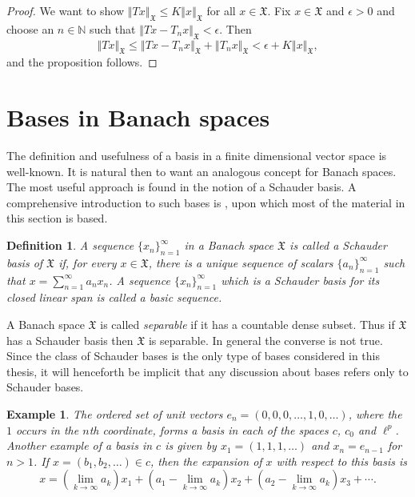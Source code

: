 \documentclass[mstat,12pt]{unswthesis}  %
\newcommand{\N}{\mathbb{N}}
\newcommand{\X}{\mathfrak{X}}
\def\lp{\ell^p}
\def\norm#1{\left \Vert #1 \right \Vert}
\newtheorem{definition}[theorem]{Definition}
\newtheorem{example}[theorem]{Example}
\numberwithin{equation}{section}
\begin{document}
\begin{proof}
We want to show $\norm{Tx}_{\X}\leq K\norm{x}_{\X}$ for all $x\in\X$. Fix
$x\in\X$ and $\epsilon>0$ and choose an $n\in\N$ such that
$\norm{Tx-T_nx}_{\X}<\epsilon$. Then 
\[\norm{Tx}_{\X}\leq\norm{Tx-T_nx}_{\X}+\norm{T_nx}_{\X}
<\epsilon+K\norm{x}_{\X},\]
and the proposition follows.
\end{proof}



\section{Bases in Banach spaces}\label{bases}


The definition and usefulness of a basis in a finite dimensional vector space is
well-known. It is natural then to want an analogous concept for
Banach spaces. The most useful approach is found in the notion of a Schauder
basis. A comprehensive introduction to such bases is \cite[pp. 1--52]{Lind},
upon which most of the material in this section is based. 

\begin{definition}
A sequence $\{x_n\}_{n=1}^{\infty}$ in a Banach space $\X$ is called a {\em 
Schauder basis of $\X$} if, for every $x\in\X$, there is a unique sequence of
scalars $\{a_n\}_{n=1}^{\infty}$ such that $x=\sum_{n=1}^{\infty}a_nx_n$. A
sequence $\{x_n\}_{n=1}^{\infty}$ which is a Schauder basis for its closed
linear span is called a {\em basic sequence}.
\end{definition}

A Banach space $\X$ is called {\em separable} if it has a countable dense 
subset.
Thus if $\X$ has a Schauder basis then $\X$ is separable. In general the 
converse
is not true. Since the class of Schauder bases is the only type of bases
considered in this
thesis, it will henceforth be implicit that any discussion about bases refers
only to Schauder bases.


\begin{example}
The ordered set of unit vectors $e_n=(0,0,0,\ldots,1,0,\ldots)$, where the $1$
occurs in the $n$th coordinate, forms a basis in each of the spaces
$c$, $c_0$ and $\lp$. Another example of a basis in $c$ is given by
$x_1=(1,1,1,\ldots)$
and $x_n=e_{n-1}$ for $n>1$. If $x=(b_1,b_2,\ldots)\in c$, then the expansion of
$x$ with respect to this basis is
\[x=(\lim_{k\rightarrow\infty}a_k)x_1+(a_1-\lim_{k\rightarrow\infty}a_k)x_2+
(a_2-\lim_{k\rightarrow\infty}a_k)x_3+\cdots.\] 
\end{example}
\end{document}

